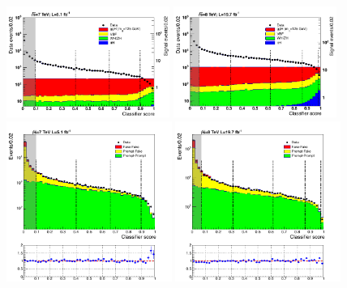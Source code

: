 \begin{figure}
  \includegraphics[width=0.475\textwidth]{selec_and_cats/plots/mixedbdt_transformed_7TeV_fix_fix.pdf} \hspace{0.05cm}
  \includegraphics[width=0.475\textwidth]{selec_and_cats/plots/mixedbdt_transformed_8TeV_fix_fix.pdf} \\ 
  \includegraphics[width=0.48\textwidth]{selec_and_cats/plots/diphobdt_transformed_bg_7TeV_fix_fix.pdf} \hspace{0.05cm}
  \includegraphics[width=0.48\textwidth]{selec_and_cats/plots/diphobdt_transformed_bg_8TeV_fix_fix.pdf}

\end{figure}
